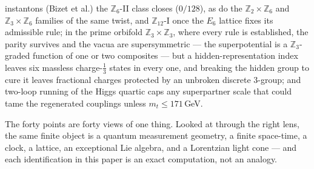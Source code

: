 \documentclass[11pt,twoside]{article}
\theoremstyle{plain}
\theoremstyle{definition}
\theoremstyle{remark}
\newcommand{\Z}{\mathbb{Z}}
\begin{document}
instantons (Bizet et al.) the $\Z_6$-II class closes ($0/128$), as do the $\Z_2\times\Z_6$ and $\Z_3\times\Z_6$
families of the same twist, and $\Z_{12}$-I once the $E_6$ lattice fixes its admissible rule; in the prime
orbifold $\Z_3\times\Z_3$, where every rule is established, the parity survives and the vacua are
supersymmetric --- the superpotential is a $\Z_3$-graded function of one or two composites --- but a
hidden-representation index leaves six massless charge-$\tfrac13$ states in every one, and breaking the hidden
group to cure it leaves fractional charges protected by an unbroken discrete $3$-group; and
two-loop running of the Higgs quartic caps any superpartner scale that could tame the regenerated
couplings unless $m_t\le171$\,GeV.

\vspace{6mm}
\begin{keyidea}
The forty points are forty views of one thing. Looked at through the right lens, the
same finite object is a quantum measurement geometry, a finite space-time, a clock, a
lattice, an exceptional Lie algebra, and a Lorentzian light cone --- and each
identification in this paper is an exact computation, not an analogy.
\end{keyidea}

\clearpage
\tableofcontents
\clearpage













\appendix



\end{document}

